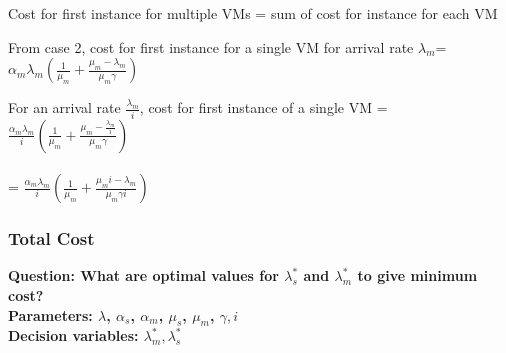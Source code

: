 \documentclass[letter,11pt]{article}
\begin{document}
\begin{itemize}
Cost for first instance for multiple VMs = sum of cost for instance for each VM

From case 2, cost for first instance for a single VM for arrival rate $\lambda_m$= $\alpha_m \lambda_m(\frac{1}{\mu_m} + \frac{\mu_m - \lambda_m}{\mu_m \gamma}) $

For an arrival rate $\frac{\lambda_m}{i}$, cost for first instance of a single VM = $\frac{\alpha_m \lambda_m}{i} (\frac{1}{\mu_m} + \frac{\mu_m - \frac{\lambda_m}{i}}{\mu_m \gamma})$ \\ \\
 = $\frac{\alpha_m \lambda_m}{i} (\frac{1}{\mu_m} + \frac{\mu_m i - \lambda_m}{\mu_m \gamma i})$


\end{itemize}

\subsubsection{Total Cost} 

\textbf{Question: What are optimal values for $\lambda_s^{*}$ and $\lambda_m^{*}$ to give minimum cost?} \\
\textbf{Parameters: $\lambda$, $\alpha_s$, $\alpha_m$, $\mu_s$, $\mu_m$, $\gamma, i$} \\
\textbf{Decision variables: $\lambda_m^{*}, \lambda_s^{*}$} \\
\end{document}
